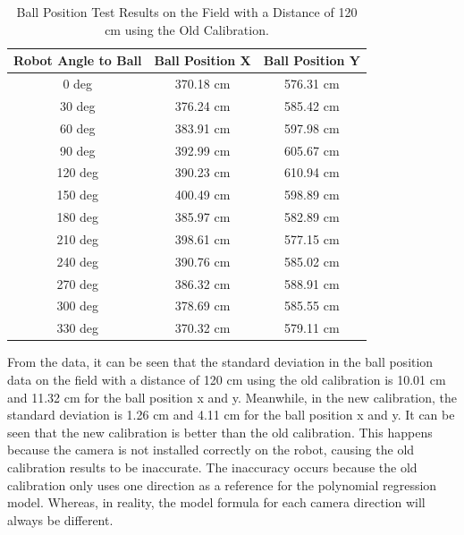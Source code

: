\begin{table}[htbp]

\caption{Ball Position Test Results on the Field with a Distance of 120 cm using the Old Calibration.}
\begin{center}

\begin{tabular}{|c|c|c|}
  \hline
  \rowcolor[HTML]{C0C0C0}
  \textbf{Robot Angle to Ball} & \textbf{Ball Position X} & \textbf{Ball Position Y} \\
  \hline
  0 deg            & 370.18 cm                & 576.31 cm            \\
  30 deg           & 376.24 cm                & 585.42 cm            \\
  60 deg           & 383.91 cm                & 597.98 cm            \\
  90 deg           & 392.99 cm                & 605.67 cm           \\
  120 deg           & 390.23 cm                & 610.94 cm           \\
  150 deg           & 400.49 cm                & 598.89 cm           \\
  180 deg           & 385.97 cm                & 582.89 cm           \\
  210 deg           & 398.61 cm                & 577.15 cm           \\
  240 deg           & 390.76 cm                & 585.02 cm           \\
  270 deg           & 386.32 cm                & 588.91 cm           \\
  300 deg           & 378.69 cm                & 585.55 cm           \\
  330 deg           & 370.32 cm                & 579.11 cm           \\
  \hline
\end{tabular}
\end{center}
\end{table}

From the data, it can be seen that the standard deviation in the ball position data on the field with a distance of 120 cm using the old calibration is 10.01 cm and 11.32 cm for the ball position x and y. Meanwhile, in the new calibration, the standard deviation is 1.26 cm and 4.11 cm for the ball position x and y. It can be seen that the new calibration is better than the old calibration. This happens because the camera is not installed correctly on the robot, causing the old calibration results to be inaccurate. The inaccuracy occurs because the old calibration only uses one direction as a reference for the polynomial regression model. Whereas, in reality, the model formula for each camera direction will always be different.

